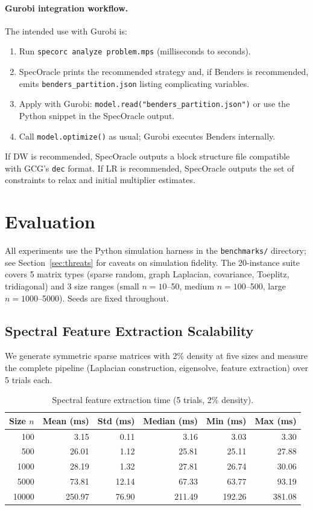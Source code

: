 \documentclass[11pt]{article}
\begin{document}
\paragraph{Gurobi integration workflow.} The intended use with Gurobi is:
\begin{enumerate}[leftmargin=*,itemsep=0pt]
\item Run \texttt{specorc analyze problem.mps} (milliseconds to seconds).
\item SpecOracle prints the recommended strategy and, if Benders is recommended, emits \texttt{benders\_partition.json} listing complicating variables.
\item Apply with Gurobi: \texttt{model.read("benders\_partition.json")} or use the Python snippet in the SpecOracle output.
\item Call \texttt{model.optimize()} as usual; Gurobi executes Benders internally.
\end{enumerate}
If DW is recommended, SpecOracle outputs a block structure file compatible with GCG's \texttt{dec} format. If LR is recommended, SpecOracle outputs the set of constraints to relax and initial multiplier estimates.

\section{Evaluation}
\label{sec:eval}

All experiments use the Python simulation harness in the \texttt{benchmarks/} directory; see Section~\ref{sec:threats} for caveats on simulation fidelity. The 20-instance suite covers 5 matrix types (sparse random, graph Laplacian, covariance, Toeplitz, tridiagonal) and 3 size ranges (small $n=10$--50, medium $n=100$--500, large $n=1000$--5000). Seeds are fixed throughout.

\subsection{Spectral Feature Extraction Scalability}

We generate symmetric sparse matrices with 2\% density at five sizes and measure the complete pipeline (Laplacian construction, eigensolve, feature extraction) over 5 trials each.

\begin{table}[h]
\centering
\caption{Spectral feature extraction time (5 trials, 2\% density).}
\label{tab:scalability}
\begin{tabular}{rrrrrr}
\toprule
\textbf{Size $n$} & \textbf{Mean (ms)} & \textbf{Std (ms)} & \textbf{Median (ms)} & \textbf{Min (ms)} & \textbf{Max (ms)} \\
\midrule
100   &   3.15 & 0.11 &  3.16 &  3.03 &  3.30 \\
500   &  26.01 & 1.12 & 25.81 & 25.11 & 27.88 \\
1000  &  28.19 & 1.32 & 27.81 & 26.74 & 30.06 \\
5000  &  73.81 & 12.14 & 67.33 & 63.77 & 93.19 \\
10000 & 250.97 & 76.90 & 211.49 & 192.26 & 381.08 \\
\bottomrule
\end{tabular}
\end{table}
\end{document}
